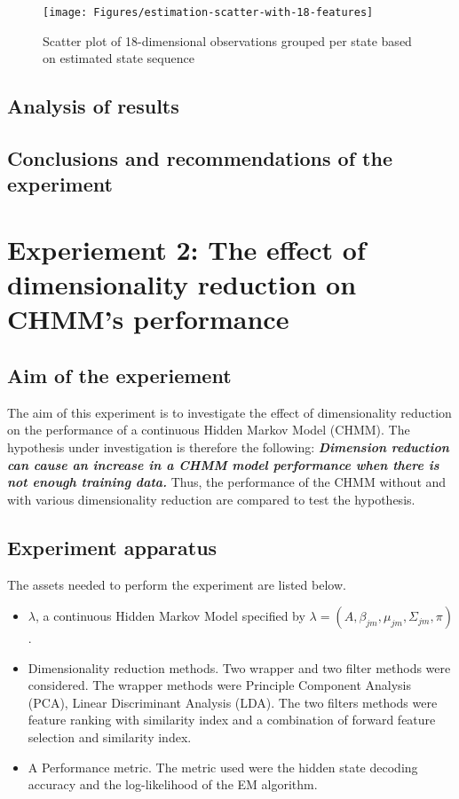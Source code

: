 \begin{figure}[ht!]
	\texttt{[image: Figures/estimation-scatter-with-18-features]}
	\caption{Scatter plot of 18-dimensional observations grouped per state based on estimated state sequence}
	\label{fig:es-18dim}
\end{figure}

\subsection{Analysis of results}

\subsection{Conclusions and recommendations of the experiment}

\section{Experiement 2: The effect of dimensionality reduction on CHMM's performance}  \label{exp:dim}

\subsection{Aim of the experiement}
The aim of this experiment is to investigate the effect of dimensionality reduction on the performance of a continuous Hidden Markov Model (CHMM).
The hypothesis under investigation is therefore the following:
\textbf{\textit{Dimension reduction can cause an increase in a CHMM model performance when there is not enough training data.}}
Thus, the performance of the CHMM without and with various dimensionality reduction are compared to test the hypothesis.

\subsection{Experiment apparatus}
The assets needed to perform the experiment are listed below.
\begin{itemize}
	\item \(\lambda\), a continuous Hidden Markov Model specified by \(\lambda = (A, \beta_{jm}, \mu_{jm}, \Sigma_{jm}, \pi)\).
	\item Dimensionality reduction methods. Two wrapper and two filter methods were considered. The wrapper methods were Principle Component Analysis (PCA), Linear Discriminant Analysis (LDA). The two filters methods were feature ranking with similarity index %
	and a combination of forward feature selection and similarity index.
	\item A Performance metric. The metric used were the hidden state decoding accuracy and the log-likelihood of the EM algorithm.
\end{itemize}

